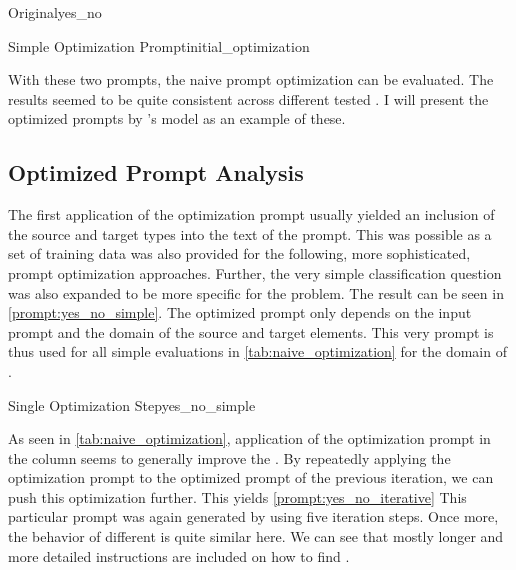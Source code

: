 \begin{prompt}{\KISS Original}{yes_no}
    \\
    
\end{prompt}

\begin{prompt}{Simple Optimization Prompt}{initial_optimization}
    \\
    
\end{prompt}

With these two prompts, the naive prompt optimization can be evaluated.
The results seemed to be quite consistent across different tested \LLMs.
I will present the optimized prompts by \OAI's \gpt model as an example of these.

\subsection{Optimized Prompt Analysis}
\label{subsec:Evaluation:naive_optimization:optimized-prompt-analysis}
The first application of the optimization prompt usually yielded an inclusion of the source and target types into the text of the prompt.
This was possible as a set of training data was also provided for the following, more sophisticated, prompt optimization approaches.
Further, the very simple classification question  was also expanded to be more specific for the \TLR problem.
The result can be seen in \autoref{prompt:yes_no_simple}.
The optimized prompt only depends on the input prompt and the domain of the source and target elements.
This very prompt is thus used for all simple \gpt evaluations in \autoref{tab:naive_optimization} for the domain of \RtR.

\begin{prompt}{\KISS Single Optimization Step}{yes_no_simple}
    \\
    
\end{prompt}

As seen in \autoref{tab:naive_optimization}, application of the optimization prompt in the column  seems to generally improve the \fone.
By repeatedly applying the optimization prompt to the optimized prompt of the previous iteration, we can push this optimization further.
This yields \autoref{prompt:yes_no_iterative}
This particular prompt was again generated by \gpt using five iteration steps.
Once more, the behavior of different \LLMs is quite similar here.
We can see that mostly longer and more detailed instructions are included on how to find \TLs.

